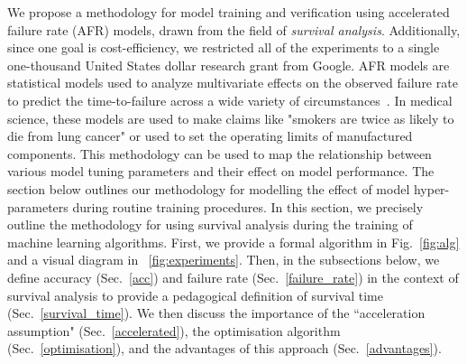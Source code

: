 \documentclass[journal]{IEEEtran}
\begin{document}
We propose a methodology for model training and verification using accelerated failure rate (AFR) models, drawn from the field of \textit{survival analysis}. Additionally, since one goal is cost-efficiency, we restricted all of the experiments to a single one-thousand United States dollar research grant from Google.
AFR models are statistical models used to analyze multivariate effects on the observed failure rate to predict the time-to-failure across a wide variety of circumstances~\cite{aft_models,kleinbaum1996survival}. In medical science, these models are used to make claims like "smokers are twice as likely to die from lung cancer" or used to set the operating limits of manufactured components. This methodology can be used to map the relationship between various model tuning parameters and their effect on model performance.
The section below outlines our methodology for modelling the effect of model hyper-parameters during routine training procedures. In this section, we precisely outline the methodology for using survival analysis during the training of machine learning algorithms. First, we provide a formal algorithm in Fig.~\ref{fig:alg} and a visual diagram in ~\ref{fig:experiments}. Then, in  the subsections below, we define accuracy (Sec.~\ref{acc}) and failure rate (Sec.~\ref{failure_rate})  in the context of survival analysis to provide a pedagogical definition of survival time (Sec.~\ref{survival_time}). We then discuss the importance of the ``acceleration assumption" (Sec.~\ref{accelerated}), the optimisation algorithm (Sec.~\ref{optimisation}), and the advantages of this approach (Sec.~\ref{advantages}).
\end{document}
